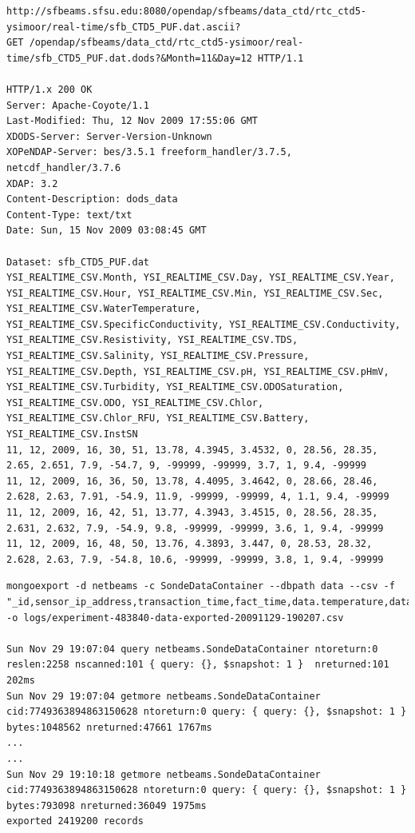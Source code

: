 \lstset{label=file:rtc-ysi-opendap,caption=HTTP GET Request x Response to the OPeNDAP server at SF-BEAMS}
\begin{lstlisting}
http://sfbeams.sfsu.edu:8080/opendap/sfbeams/data_ctd/rtc_ctd5-ysimoor/real-time/sfb_CTD5_PUF.dat.ascii?
GET /opendap/sfbeams/data_ctd/rtc_ctd5-ysimoor/real-time/sfb_CTD5_PUF.dat.dods?&Month=11&Day=12 HTTP/1.1

HTTP/1.x 200 OK
Server: Apache-Coyote/1.1
Last-Modified: Thu, 12 Nov 2009 17:55:06 GMT
XDODS-Server: Server-Version-Unknown
XOPeNDAP-Server: bes/3.5.1 freeform_handler/3.7.5, netcdf_handler/3.7.6
XDAP: 3.2
Content-Description: dods_data
Content-Type: text/txt
Date: Sun, 15 Nov 2009 03:08:45 GMT

Dataset: sfb_CTD5_PUF.dat
YSI_REALTIME_CSV.Month, YSI_REALTIME_CSV.Day, YSI_REALTIME_CSV.Year, YSI_REALTIME_CSV.Hour, YSI_REALTIME_CSV.Min, YSI_REALTIME_CSV.Sec, YSI_REALTIME_CSV.WaterTemperature, YSI_REALTIME_CSV.SpecificConductivity, YSI_REALTIME_CSV.Conductivity, YSI_REALTIME_CSV.Resistivity, YSI_REALTIME_CSV.TDS, YSI_REALTIME_CSV.Salinity, YSI_REALTIME_CSV.Pressure, YSI_REALTIME_CSV.Depth, YSI_REALTIME_CSV.pH, YSI_REALTIME_CSV.pHmV, YSI_REALTIME_CSV.Turbidity, YSI_REALTIME_CSV.ODOSaturation, YSI_REALTIME_CSV.ODO, YSI_REALTIME_CSV.Chlor, YSI_REALTIME_CSV.Chlor_RFU, YSI_REALTIME_CSV.Battery, YSI_REALTIME_CSV.InstSN
11, 12, 2009, 16, 30, 51, 13.78, 4.3945, 3.4532, 0, 28.56, 28.35, 2.65, 2.651, 7.9, -54.7, 9, -99999, -99999, 3.7, 1, 9.4, -99999
11, 12, 2009, 16, 36, 50, 13.78, 4.4095, 3.4642, 0, 28.66, 28.46, 2.628, 2.63, 7.91, -54.9, 11.9, -99999, -99999, 4, 1.1, 9.4, -99999
11, 12, 2009, 16, 42, 51, 13.77, 4.3943, 3.4515, 0, 28.56, 28.35, 2.631, 2.632, 7.9, -54.9, 9.8, -99999, -99999, 3.6, 1, 9.4, -99999
11, 12, 2009, 16, 48, 50, 13.76, 4.3893, 3.447, 0, 28.53, 28.32, 2.628, 2.63, 7.9, -54.8, 10.6, -99999, -99999, 3.8, 1, 9.4, -99999
\end{lstlisting}

\lstset{label=file:mongodb-export-command,caption=Export Command to CSV format}
\begin{lstlisting}
mongoexport -d netbeams -c SondeDataContainer --dbpath data --csv -f "_id,sensor_ip_address,transaction_time,fact_time,data.temperature,data.sp_condition,data.condition,data.resistence,data.salinitude,data.pressure,data.depth,data.ph,data.pH_mv,data.odo_sat,data.odo_condition,data.turbidity,data.battery" -o logs/experiment-483840-data-exported-20091129-190207.csv

Sun Nov 29 19:07:04 query netbeams.SondeDataContainer ntoreturn:0 reslen:2258 nscanned:101 { query: {}, $snapshot: 1 }  nreturned:101 202ms
Sun Nov 29 19:07:04 getmore netbeams.SondeDataContainer cid:7749363894863150628 ntoreturn:0 query: { query: {}, $snapshot: 1 }  bytes:1048562 nreturned:47661 1767ms
...
...
Sun Nov 29 19:10:18 getmore netbeams.SondeDataContainer cid:7749363894863150628 ntoreturn:0 query: { query: {}, $snapshot: 1 }  bytes:793098 nreturned:36049 1975ms
exported 2419200 records
\end{lstlisting}


